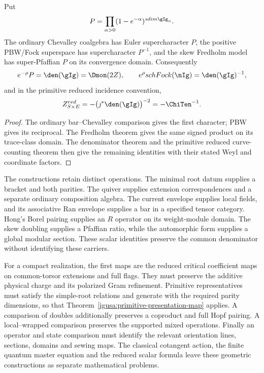 \begin{theorem}
Put
\[
 P=\prod_{\alpha>0}(1-e^{-\alpha})^{\operatorname{sdim}\gIg_\alpha}.
\]
The ordinary Chevalley coalgebra has Euler supercharacter \(P\),
the positive PBW/Fock superspace has supercharacter \(P^{-1}\),
and the skew Fredholm model has super-Pfaffian \(P\) on its
convergence domain. Consequently
\[
 e^{-\rho}P=\den(\gIg)=\Dmon(2Z),\qquad
 e^{\rho}\operatorname{sch}\operatorname{Fock}(\nIg)
     =\den(\gIg)^{-1},
\]
and in the primitive reduced incidence convention,
\[
 \mathcal Z^{\mathrm{red}}_{S\times E}
    =-\bigl(\jmath^*\den(\gIg)\bigr)^{-2}
    =-\ChiTen^{-1}.
\]
\end{theorem}
\begin{proof}
The ordinary bar--Chevalley comparison gives the first character;
PBW gives its reciprocal. The Fredholm theorem gives the same
signed product on its trace-class domain. The denominator theorem
and the primitive reduced curve-counting theorem then give the
remaining identities with their stated Weyl and coordinate factors.
\end{proof}

The constructions retain distinct operations. The minimal root
datum supplies a bracket and both parities. The quiver supplies
extension correspondences and a separate ordinary composition
algebra. The current envelope supplies local fields, and its
associative Ran envelope supplies a bar in a specified tensor
category. Hong's Borel pairing supplies an \(R\) operator on its
weight-module domain. The skew doubling supplies a Pfaffian ratio,
while the automorphic form supplies a global modular section.
These scalar identities preserve the common denominator without
identifying these carriers.

For a compact realization, the first maps are the reduced critical
coefficient maps on common-torsor extensions and full flags. They
must preserve the additive physical charge and its polarized Gram
refinement. Primitive representatives must satisfy the simple-root
relations and generate with the required parity dimensions, so that
Theorem~\ref{igusa:primitive-presentation-map} applies. A comparison
of doubles additionally preserves a coproduct and full Hopf pairing.
A local--wrapped comparison preserves the supported mixed operations.
Finally an operator and state comparison must identify the relevant
orientation lines, sections, domains and sewing maps. The classical
cotangent action, the finite quantum master equation and the reduced
scalar formula leave these geometric constructions as separate
mathematical problems.
